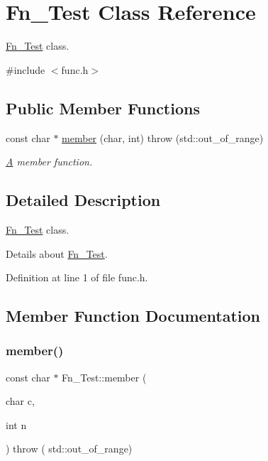 \hypertarget{class_fn___test}{}\section{Fn\+\_\+\+Test Class Reference}
\label{class_fn___test}


\mbox{\hyperlink{class_fn___test}{Fn\+\_\+\+Test}} class.  




{\ttfamily \#include $<$func.\+h$>$}

\subsection*{Public Member Functions}
\begin{DoxyCompactItemize}
\item 
const char $\ast$ \mbox{\hyperlink{class_fn___test_a823b5c9726bb8f6ece50e57ac8e3092c}{member}} (char, int)  throw (std\+::out\+\_\+of\+\_\+range)
\begin{DoxyCompactList}\small\item\em \mbox{\hyperlink{class_a}{A}} member function. \end{DoxyCompactList}\end{DoxyCompactItemize}


\subsection{Detailed Description}
\mbox{\hyperlink{class_fn___test}{Fn\+\_\+\+Test}} class. 

Details about \mbox{\hyperlink{class_fn___test}{Fn\+\_\+\+Test}}. 

Definition at line 1 of file func.\+h.



\subsection{Member Function Documentation}
\mbox{\label{class_fn___test_a823b5c9726bb8f6ece50e57ac8e3092c}} 
\subsubsection{\texorpdfstring{member()}{member()}}
{\footnotesize\ttfamily const char $\ast$ Fn\+\_\+\+Test\+::member (\begin{DoxyParamCaption}\item[{char}]{c,  }\item[{int}]{n }\end{DoxyParamCaption}) throw ( std\+::out\+\_\+of\+\_\+range) }



